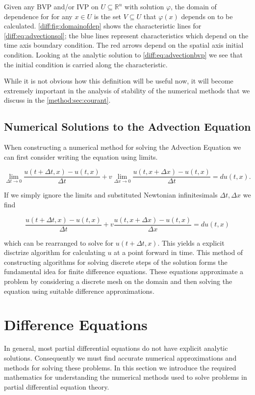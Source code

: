 \documentclass[../main.tex]{subfiles}
\begin{document}
  Given any BVP and/or IVP on $U \subseteq \mathbb{R}^n$ with solution $\varphi$, the domain of dependence for for any $x \in U$ is the set $V \subseteq U$ that $\varphi(x)$ depends on to be calculated. \autoref{diff:fig:domainofdep} shows the characteristic lines for \autoref{diff:eq:advectionsol}; the blue lines represent characteristics which depend on the time axis boundary condition. The red arrows depend on the spatial axis initial condition. Looking at the analytic solution to \autoref{diff:eq:advectionbvp} we see that the initial condition is carried along the characteristic.

  While it is not obvious how this definition will be useful now, it will become extremely important in the analysis of stability of the numerical methods that we discuss in the \autoref{method:sec:courant}.

  \subsection{Numerical Solutions to the Advection Equation} \label{diff:sec:fdesintro}
  When constructing a numerical method for solving the Advection Equation we can first consider writing the equation using limits.

  \begin{equation} \label{diff:eq:finiteadvection}
    \lim_{\Delta t \to 0} \frac{u(t + \Delta t, x) - u(t, x)}{\Delta t} + v \lim_{\Delta x \to 0} \frac{u(t, x + \Delta x) - u(t, x)}{\Delta t} = d u(t, x).
  \end{equation}

  If we simply ignore the limits and substituted Newtonian infinitesimals $\Delta t, \Delta x$ we find

  \begin{equation} \label{diff:eq:advectionfde}
    \frac{u(t + \Delta t, x) - u(t, x)}{\Delta t} + v \frac{u(t, x + \Delta x) - u(t, x)}{\Delta x} = d u(t, x)
  \end{equation}

  which can be rearranged to solve for $u(t + \Delta t, x)$. This yields a explicit disctrize algorithm for calculating $u$ at a point forward in time. This method of constructing algorithms for solving discrete steps of the solution forms the fundamental idea for finite difference equations. These equations approximate a problem by considering a discrete mesh on the domain and then solving the equation using suitable difference approximations.

  \section{Difference Equations}
  In general, most partial differential equations do not have explicit analytic solutions. Consequently we must find accurate numerical approximations and methods for solving these problems. In this section we introduce the required mathematics for understanding the numerical methods used to solve problems in partial differential equation theory.
\end{document}
